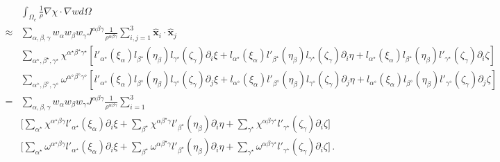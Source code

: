             \begin{align} \label{eq:sem_32}
                & \int_{\Omega_e}\frac{1}{\rho}\nabla\chi\cdot\nabla wd\Omega \nonumber \\
                \approx & \sum_{\alpha,\beta,\gamma} w_{\alpha} w_{\beta} w_{\gamma} J^{\alpha\beta\gamma} \frac{1}{\rho^{\alpha\beta\gamma}}
                \sum_{i,j=1}^{3} \hat{\bm{x}}_i \cdot \hat{\bm{x}}_j \nonumber \\
                & \sum_{\alpha^\star,\beta^\star,\gamma^\star} \chi^{\alpha^\star\beta^\star\gamma^\star}[
                    l'_{\alpha^\star}(\xi_{\alpha}) l_{\beta^\star}(\eta_{\beta}) l_{\gamma^\star}(\zeta_{\gamma})\partial_i\xi
                   + l_{\alpha^\star}(\xi_{\alpha})l'_{\beta^\star}(\eta_{\beta}) l_{\gamma^\star}(\zeta_{\gamma})\partial_i\eta
                   + l_{\alpha^\star}(\xi_{\alpha}) l_{\beta^\star}(\eta_{\beta})l'_{\gamma^\star}(\zeta_{\gamma})\partial_i\zeta] \nonumber  \\
                & \sum_{\alpha^\diamond,\beta^\diamond,\gamma^\diamond} \omega^{\alpha^\diamond\beta^\diamond\gamma^\diamond}[
                    l'_{\alpha^\diamond}(\xi_{\alpha}) l_{\beta^\diamond}(\eta_{\beta}) l_{\gamma^\diamond}(\zeta_{\gamma})\partial_j\xi
                   + l_{\alpha^\diamond}(\xi_{\alpha})l'_{\beta^\diamond}(\eta_{\beta}) l_{\gamma^\diamond}(\zeta_{\gamma})\partial_j\eta
                   + l_{\alpha^\diamond}(\xi_{\alpha}) l_{\beta^\diamond}(\eta_{\beta})l'_{\gamma^\diamond}(\zeta_{\gamma})\partial_j\zeta] \nonumber  \\
                = & \sum_{\alpha,\beta,\gamma} w_{\alpha} w_{\beta} w_{\gamma} J^{\alpha\beta\gamma} \frac{1}{\rho^{\alpha\beta\gamma}}
                \sum_{i=1}^{3} \nonumber \\
                &\bigg[\sum_{\alpha^\star}\chi^{\alpha^\star\beta\gamma}l'_{\alpha^\star}(\xi_{\alpha})  \partial_i\xi +
                  \sum_{\beta^\star} \chi^{\alpha\beta^\star\gamma}l'_{\beta^\star} (\eta_{\beta})  \partial_i\eta +
                  \sum_{\gamma^\star}\chi^{\alpha\beta\gamma^\star}l'_{\gamma^\star}(\zeta_{\gamma})\partial_i\zeta\bigg] \nonumber \\
                &\bigg[\sum_{\alpha^\star}\omega^{\alpha^\star\beta\gamma}l'_{\alpha^\star}(\xi_{\alpha})  \partial_i\xi +
                  \sum_{\beta^\star} \omega^{\alpha\beta^\star\gamma}l'_{\beta^\star} (\eta_{\beta})  \partial_i\eta +
                  \sum_{\gamma^\star}\omega^{\alpha\beta\gamma^\star}l'_{\gamma^\star}(\zeta_{\gamma})\partial_i\zeta\bigg] \, .
            \end{align}
